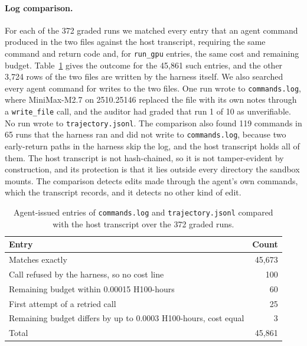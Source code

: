 \paragraph{Log comparison.} For each of the 372 graded runs we matched every
entry that an agent command produced in the two files against the host
transcript, requiring the same command and return code and, for
\texttt{run\_gpu} entries, the same cost and remaining budget.
Table~\ref{tab:log-check} gives the outcome for the 45,861 such entries, and
the other 3,724 rows of the two files are written by the harness itself. We
also searched every agent command for writes to the two files. One run wrote
to \texttt{commands.log}, where MiniMax-M2.7 on 2510.25146 replaced the file
with its own notes through a \texttt{write\_file} call, and the auditor had
graded that run 1 of 10 as unverifiable. No run wrote to
\texttt{trajectory.jsonl}. The comparison also found 119 commands in 65 runs
that the harness ran and did not write to \texttt{commands.log}, because two
early-return paths in the harness skip the log, and the host transcript holds
all of them. The host transcript is not hash-chained, so it is not
tamper-evident by construction, and its protection is that it lies outside
every directory the sandbox mounts. The comparison detects edits made through
the agent's own commands, which the transcript records, and it detects no
other kind of edit.

\begin{table}[ht]
\centering
\small
\begin{tabular}{@{}lr@{}}
\toprule
Entry & Count \\
\midrule
Matches exactly & 45,673 \\
Call refused by the harness, so no cost line & 100 \\
Remaining budget within 0.00015 H100-hours & 60 \\
First attempt of a retried call & 25 \\
Remaining budget differs by up to 0.0003 H100-hours, cost equal & 3 \\
\midrule
Total & 45,861 \\
\bottomrule
\end{tabular}
\caption{Agent-issued entries of \texttt{commands.log} and \texttt{trajectory.jsonl}
compared with the host transcript over the 372 graded runs.}
\label{tab:log-check}
\end{table}

